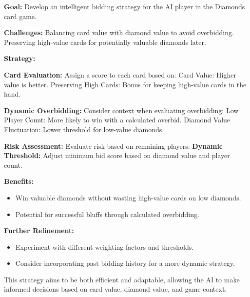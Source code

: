 \documentclass[12pt]{article} %
\begin{document}
\textbf{Goal:} Develop an intelligent bidding strategy for the AI player in the Diamonds card game.

\textbf{Challenges:}
    Balancing card value with diamond value to avoid overbidding.
  Preserving high-value cards for potentially valuable diamonds later.


\textbf{Strategy:}
    \item \textbf{Card Evaluation:} Assign a score to each card based on:
        Card Value: Higher value is better.
         Preserving High Cards: Bonus for keeping high-value cards in the hand.
    \item \textbf{Dynamic Overbidding:} Consider context when evaluating overbidding:
    Low Player Count: More likely to win with a calculated overbid.
       Diamond Value Fluctuation: Lower threshold for low-value diamonds.

     \textbf{Risk Assessment:} Evaluate risk based on remaining players.
\textbf{Dynamic Threshold:} Adjust minimum bid score based on diamond value and player count.

\textbf{Benefits:}
\begin{itemize}
    \item Win valuable diamonds without wasting high-value cards on low diamonds.
    \item Potential for successful bluffs through calculated overbidding.
\end{itemize}

\textbf{Further Refinement:}
\begin{itemize}
    \item Experiment with different weighting factors and thresholds.
    \item Consider incorporating past bidding history for a more dynamic strategy.
\end{itemize}

This strategy aims to be both efficient and adaptable, allowing the AI to make informed decisions based on card value, diamond value, and game context.
\end{document}
